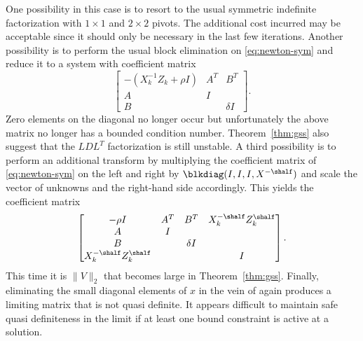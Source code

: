 \documentclass{amsart}
\begin{document}
One possibility in this case is to resort to the usual symmetric indefinite
factorization with $1 \times 1$ and $2 \times 2$ pivots. The additional cost
incurred may be acceptable since it should only be necessary in the last few
iterations. Another possibility is to perform the usual block elimination on
\eqref{eq:newton-sym} and reduce it to a system with coefficient matrix
\[
  \begin{bmatrix}
    - (X_k^{-1} Z_k + \rho I) & A^T & B^T \\
      A                       & I   &     \\
      B                       &     & \delta I
  \end{bmatrix}.
\]
Zero elements on the diagonal no longer occur but unfortunately the above
matrix no longer has a bounded condition number. Theorem~\ref{thm:gss} also
suggest that the $LDL^T$ factorization is still unstable. A third possibility
is to perform an additional transform by multiplying the coefficient matrix of
\eqref{eq:newton-sym} on the left and right by $\blkdiag(I, I, I, X^{-\shalf})$
and scale the vector of unknowns and the right-hand side accordingly. This
yields the coefficient matrix
\[
  \begin{bmatrix}
    -\rho I                     & A^T & B^T      & X_k^{-\shalf} Z_k^{\shalf} \\
     A                          & I   &          &               \\
     B                          &     & \delta I &               \\
     X_k^{-\shalf} Z_k^{\shalf} &     &          &  I
  \end{bmatrix}.
\]
This time it is $\|V\|_2$ that becomes large in Theorem~\ref{thm:gss}. Finally,
eliminating the small diagonal elements of $x$ in the vein of \cite{gould-1986}
again produces a limiting matrix that is not quasi definite. It appears
difficult to maintain safe quasi definiteness in the limit if at least one
bound constraint is active at a solution.
\end{document}
